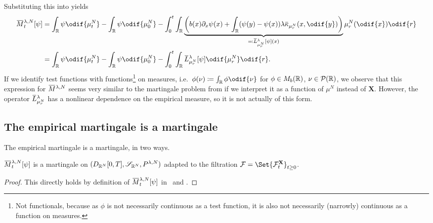 Substituting this into  yields
\begin{equation}\label{eq:emp-M-expression}
  \begin{split}
    \ol{M}_t^{\lambda, N}[\psi]
     & = \int_\potspace \psi \odif{\mu_t^N} - \int_\potspace \psi \odif{\mu_0^N}
    - \int_0^t \int_\potspace \underbrace{\br*{ b(x) \partial_x \psi(x) + \int_\potspace (\psi(y) - \psi(x)) \lambda \ol{\kappa}_{\mu_{r}^N}(x, \odif{y}) }}_{\eqqcolon \ol{L}_{\mu_{r}^N}^{\lambda} [\psi](x)} \mu_{r}^N(\odif{x}) \odif{r} \\
     & = \int_\potspace \psi \odif{\mu_t^N} - \int_\potspace \psi \odif{\mu_0^N}
    - \int_0^t \int_\potspace \ol{L}_{\mu_{r}^N}^{\lambda} [\psi] \odif{\mu_{r}^N} \odif{r}.
  \end{split}
\end{equation}
If we identify test functions with functions\footnote{Not functionals, because as \( \phi \) is not necessarily continuous as a test function, it is also not necessarily (narrowly) continuous as a function on measures.} on measures, i.e.\ \( \phi(\nu) \coloneqq \int_\potspace \phi \odif{\nu} \) for \(\phi \in M_b(\mathbb{R})\), \( \nu \in \mathcal{P}(\mathbb{R}) \), we observe that this expression for \(\ol{M}^{\lambda,N}\) seems very similar to the martingale problem from  if we interpret it as a function of \(\mu^N\) instead of \(\bm{X}\).
However, the operator \(\ol{L}_{\mu_{r}^N}^{\lambda}\) has a nonlinear dependence on the empirical measure, so it is not actually of this form.

\subsection{The empirical martingale is a martingale}

The empirical martingale is a martingale, in two ways.
\begin{corollary}\label{cor:easy-emp-M-mart}
  \(\ol{M}_t^{\lambda,N}[\psi]\) is a martingale on \((D_{\mathbb{R}^N}[0,T], \mathscr{S}_{\mathbb{R}^N}, P^{\lambda, N})\) adapted to the filtration \( \cF = \Set{\cF_t^\bm{X}}_{t\geq0} \).
\end{corollary}
\begin{proof}
  This directly holds by definition of \( \ol{M}_t^{\lambda,N}[\psi] \) in~ and .
\end{proof}

